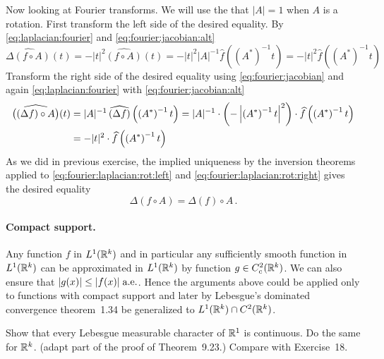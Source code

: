\begin{enumerate}
Now looking at Fourier transforms.
We will use the that \(|A|=1\) when $A$ is a rotation.
First transform the left side of the desired equality.
By \eqref{eq:laplacian:fourier} and \eqref{eq:fourier:jacobian:alt}
\begin{equation} \label{eq:fourier:laplacian:rot:left}
 \widehat{\Delta(f \circ A)}(t) 
 = -|t|^2 \widehat{(f \circ A)}(t)
 = -|t|^2 |A|^{-1} \widehat{f}\left(\left(A^*\right)^{-1}t\right)
 = -|t|^2 \widehat{f}\left(\left(A^*\right)^{-1}t\right)
\end{equation}
Transform the right side of the desired equality using
\eqref{eq:fourier:jacobian} 
and again  \eqref{eq:laplacian:fourier} 
 with \eqref{eq:fourier:jacobian:alt}
\begin{align}
 \widehat{\bigl((\Delta f) \circ A\bigr)}(t) 
&= |A|^{-1}\,\widehat{(\Delta f)}\left(\left(A^*\right)^{-1}t\right) 
 = |A|^{-1}
   \cdot 
   \left(-\left|\left(A^*\right)^{-1}t\right|^2\right)
   \cdot
   \widehat{f}\left(\left(A^*\right)^{-1}t\right) \notag 
   \\
   \label{eq:fourier:laplacian:rot:right}
&=  -|t|^2\cdot \widehat{f}\left(\left(A^*\right)^{-1}t\right) 
\end{align}
As we did in previous exercise, 
the implied uniqueness by the inversion theorems applied to 
\eqref{eq:fourier:laplacian:rot:left} and
\eqref{eq:fourier:laplacian:rot:right}
gives the desired equality
\begin{equation*}
 \Delta(f \circ A) = \Delta(f) \circ A\,.
\end{equation*}

\paragraph{Compact support.} Any function $f$ in \(L^1(\mathbb{R}^k)\)
and in particular any sufficiently smooth function in \(L^1(\mathbb{R}^k)\)
can be approximated in \(L^1(\mathbb{R}^k)\) by function \(g\in C_c^2(\mathbb{R}^k)\).
We can also ensure that \(|g(x)|\leq |f(x)|\;\textrm{a.e.}\).
Hence 
the arguments above could be applied only to functions with compact support
and later by Lebesgue's dominated convergence theorem~1.34
be generalized to \(L^1(\mathbb{R}^k)\cap C^2(\mathbb{R}^k)\).


\begin{excopy}
Show that every Lebesgue measurable character of \(\mathbb{R}^1\) is continuous.
Do the same for \(\mathbb{R}^k\).
(adapt part of the proof of Theorem~9.23.)
Compare with Exercise~18.
\end{excopy}


\end{enumerate}
